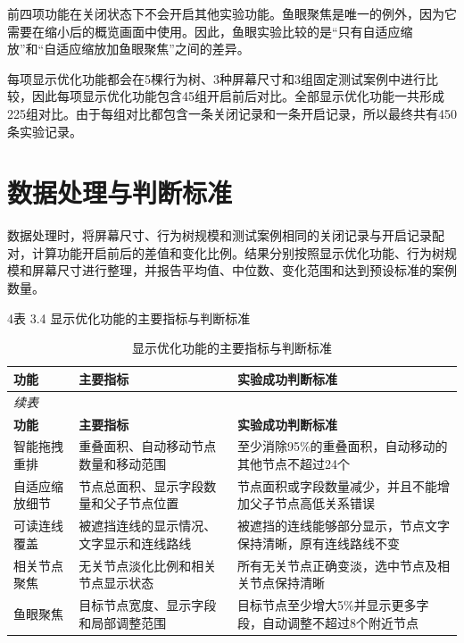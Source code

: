 \documentclass[11pt,a4paper,oneside,extrafontsizes]{memoir}
\begin{document}
前四项功能在关闭状态下不会开启其他实验功能。鱼眼聚焦是唯一的例外，因为它需要在缩小后的概览画面中使用。因此，鱼眼实验比较的是“只有自适应缩放”和“自适应缩放加鱼眼聚焦”之间的差异。

每项显示优化功能都会在5棵行为树、3种屏幕尺寸和3组固定测试案例中进行比较，因此每项显示优化功能包含45组开启前后对比。全部显示优化功能一共形成225组对比。由于每组对比都包含一条关闭记录和一条开启记录，所以最终共有450条实验记录。

\section{数据处理与判断标准}

数据处理时，将屏幕尺寸、行为树规模和测试案例相同的关闭记录与开启记录配对，计算功能开启前后的差值和变化比例。结果分别按照显示优化功能、行为树规模和屏幕尺寸进行整理，并报告平均值、中位数、变化范围和达到预设标准的案例数量。

4表 3.4 显示优化功能的主要指标与判断标准

\begin{center}

\begin{longtable}{@{}p{} p{} p{}@{}}
\caption{显示优化功能的主要指标与判断标准}\label{tab:display-metrics-criteria}\\
\toprule
\textbf{功能} & \textbf{主要指标} & \textbf{实验成功判断标准} \\
\midrule
\endfirsthead
\multicolumn{3}{l}{\itshape 续表}\\
\toprule
\textbf{功能} & \textbf{主要指标} & \textbf{实验成功判断标准} \\
\midrule
\endhead
智能拖拽重排 & 重叠面积、自动移动节点数量和移动范围 & 至少消除95\%的重叠面积，自动移动的其他节点不超过24个 \\
自适应缩放细节 & 节点总面积、显示字段数量和父子节点位置 & 节点面积或字段数量减少，并且不能增加父子节点高低关系错误 \\
可读连线覆盖 & 被遮挡连线的显示情况、文字显示和连线路线 & 被遮挡的连线能够部分显示，节点文字保持清晰，原有连线路线不变 \\
相关节点聚焦 & 无关节点淡化比例和相关节点显示状态 & 所有无关节点正确变淡，选中节点及相关节点保持清晰 \\
鱼眼聚焦 & 目标节点宽度、显示字段和局部调整范围 & 目标节点至少增大5\%并显示更多字段，自动调整不超过8个附近节点 \\
\bottomrule
\end{longtable}
\end{center}
\end{document}
